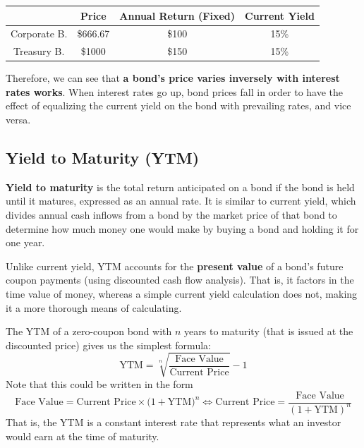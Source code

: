 \documentclass{article}
\begin{document}
    \begin{center}
    \begin{tabular}{c|c|c|c}
       & Price & Annual Return (Fixed) & Current Yield \\
       \hline
      Corporate B. & \$666.67 & \$100 & 15\% \\
      Treasury B. & \$1000 & \$150 & 15\%
    \end{tabular}
    \end{center}

    Therefore, we can see that \textbf{a bond's price varies inversely with interest rates works}. When interest rates go up, bond prices fall in order to have the effect of equalizing the current yield on the bond with prevailing rates, and vice versa. 

  \subsection{Yield to Maturity (YTM)}

    \textbf{Yield to maturity} is the total return anticipated on a bond if the bond is held until it matures, expressed as an annual rate. It is similar to current yield, which divides annual cash inflows from a bond by the market price of that bond to determine how much money one would make by buying a bond and holding it for one year. 

    Unlike current yield, YTM accounts for the \textbf{present value} of a bond's future coupon payments (using discounted cash flow analysis). That is, it factors in the time value of money, whereas a simple current yield calculation does not, making it a more thorough means of calculating. 

    \begin{definition}
      The YTM of a zero-coupon bond with $n$ years to maturity (that is issued at the discounted price) gives us the simplest formula: 
      \[\text{YTM} = \sqrt[n]{\frac{\text{Face Value}}{\text{Current Price}}} - 1\]
      Note that this could be written in the form 
      \[\text{Face Value} = \text{Current Price} \times \big( 1 + \text{YTM} \big)^n \iff \text{Current Price} = \frac{\text{Face Value}}{(1 + \text{YTM})^n}\]
      That is, the YTM is a constant interest rate that represents what an investor would earn at the time of maturity. 
    \end{definition}
\end{document}
